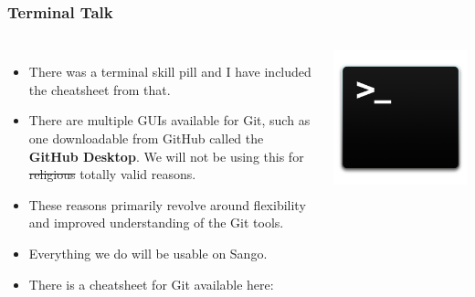 \documentclass{beamer}
\begin{document}
\begin{frame}[fragile]
\frametitle{Terminal Talk}
\begin{columns}

\begin{itemize}
\item There was a terminal skill pill and I have included the cheatsheet from that. %
\item There are multiple GUIs available for Git, such as one downloadable from GitHub called the \textbf{GitHub Desktop}. We will not be using this for \sout{religious} totally valid reasons.
\item These reasons primarily revolve around flexibility and improved understanding of the Git tools.
\item Everything we do will be usable on Sango.
\item There is a cheatsheet for Git available here: \href{https://www.git-tower.com/learn/cheat-sheets/git}{\textbf{\color{blue}{https://www.git-tower.com/learn/cheat-sheets/git}}}
\end{itemize}

\includegraphics[width=\textwidth]{terminal.png}
\end{columns}
\end{frame}
\end{document}
